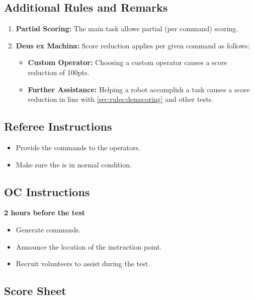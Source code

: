 %
%
\subsection*{Additional Rules and Remarks}
\begin{enumerate}[nosep]
	\item \textbf{Partial Scoring:} The main task allows partial (per command) scoring.
	
	\item \textbf{Deus ex Machina:} Score reduction applies per given command as follows:
	\begin{itemize}[nosep]
		\item \textbf{Custom Operator:} Choosing a custom operator causes a score reduction of 100pts.
		\item \textbf{Further Assistance:} Helping a robot accomplish a task causes a score reduction in line with \ref{sec:rules:demscoring} and other \STWO{} tests.
	\end{itemize}
\end{enumerate}


\subsection*{Referee Instructions}
\begin{itemize}[nosep]
	\item Provide the commands to the operators.
	\item Make sure the \Arena{} is in normal condition.
\end{itemize}


\subsection*{OC Instructions}
\textbf{2 hours before the test}
\begin{itemize}[nosep]
	\item Generate commands.
	\item Announce the location of the instruction point.
	\item Recruit volunteers to assist during the test.
\end{itemize}

\subsection*{Score Sheet}


